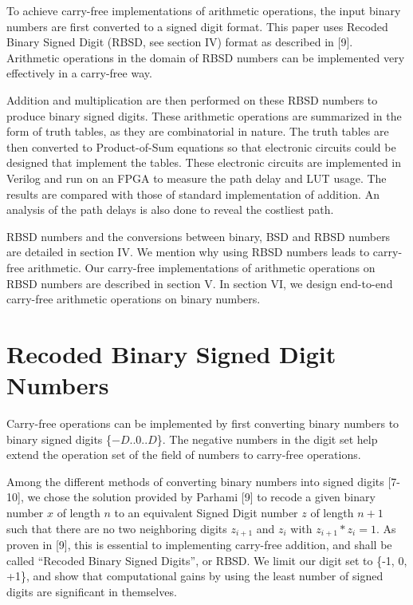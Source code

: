 \documentclass[conference]{IEEEtran}
\begin{document}
To achieve carry-free implementations of arithmetic operations, the input binary numbers are first converted to a signed digit format. This paper uses Recoded Binary Signed Digit (RBSD, see section IV) format as described in [9]. Arithmetic operations in the domain of RBSD numbers can be implemented very effectively in a carry-free way.

Addition and multiplication are then performed on these RBSD numbers to produce binary signed digits. These arithmetic operations are summarized in the form of truth tables, as they are combinatorial in nature. The truth tables are then converted to Product-of-Sum equations so that electronic circuits could be designed that implement the tables. These electronic circuits are implemented in Verilog and run on an FPGA to measure the path delay and LUT usage. The results are compared with those of standard implementation of addition. An analysis of the path delays is also done to reveal the costliest path.

RBSD numbers and the conversions between binary, BSD and RBSD numbers are detailed in section IV. We mention why using RBSD numbers leads to carry-free arithmetic. Our carry-free implementations of arithmetic operations on RBSD numbers are described in section V. In section VI, we design end-to-end carry-free arithmetic operations on binary numbers.


\section{Recoded Binary Signed Digit Numbers}

Carry-free operations can be implemented by first converting binary numbers to binary signed digits \{$-D$..$0$..$D$\}. The negative numbers in the digit set help extend the operation set of the field of numbers to carry-free operations.

Among the different methods of converting binary numbers into signed digits [7-10], we chose  the solution provided by Parhami [9] to recode a given binary number $x$ of length $n$ to an equivalent Signed Digit number $z$ of length $n+1$ such that there are no two neighboring digits $z_{i+1}$ and $z_{i}$ with $z_{i+1} * z_{i} = 1$. As proven in [9], this is essential to implementing carry-free addition, and shall be called ``Recoded Binary Signed Digits'', or RBSD. We limit our digit set to \{-1, 0, +1\}, and show that computational gains by using the least number of signed digits are significant in themselves.
\end{document}
